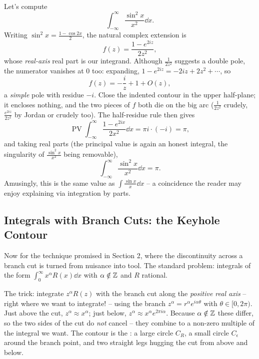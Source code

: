 \documentclass[a4paper]{scrartcl}
\newcommand{\pv}{\operatorname{PV}}
\begin{document}
\begin{example}
	Let's compute
	$$
	\int_{-\infty}^\infty \frac{\sin^2 x}{x^2} \dd x.
	$$
	Writing $\sin^2 x = \frac{1 - \cos 2x}{2}$, the natural complex extension is
	$$
	f(z) = \frac{1 - e^{2iz}}{2z^2},
	$$
	whose \emph{real-axis} real part is our integrand. Although $\frac{1}{2z^2}$ suggests a double pole, the numerator vanishes at $0$ too: expanding, $1 - e^{2iz} = -2iz + 2z^2 + \cdots$, so
	$$
	f(z) = -\frac iz + 1 + O(z),
	$$
	a \emph{simple} pole with residue $-i$. Close the indented contour in the upper half-plane; it encloses nothing, and the two pieces of $f$ both die on the big arc ($\frac{1}{2z^2}$ crudely, $\frac{e^{2iz}}{2z^2}$ by Jordan or crudely too). The half-residue rule then gives
	$$
	\pv \int_{-\infty}^\infty \frac{1 - e^{2ix}}{2x^2} \dd x = \pi i \cdot (-i) = \pi,
	$$
	and taking real parts (the principal value is again an honest integral, the singularity of $\frac{\sin^2 x}{x^2}$ being removable),
	$$
	\int_{-\infty}^\infty \frac{\sin^2 x}{x^2} \dd x = \pi.
	$$
	Amusingly, this is the same value as $\int \frac{\sin x}{x} \dd x$ -- a coincidence the reader may enjoy explaining via integration by parts.
\end{example}

\subsection{Integrals with Branch Cuts: the Keyhole Contour}

Now for the technique promised in Section 2, where the discontinuity across a branch cut is turned from nuisance into tool. The standard problem: integrals of the form $\int_0^\infty x^\alpha R(x) \dd x$ with $\alpha \notin \mathbb{Z}$ and $R$ rational.

The trick: integrate $z^\alpha R(z)$ with the branch cut along the \emph{positive real axis} -- right where we want to integrate! -- using the branch $z^\alpha = r^\alpha e^{i\alpha\theta}$ with $\theta \in [0, 2\pi)$. Just above the cut, $z^\alpha \approx x^\alpha$; just below, $z^\alpha \approx x^\alpha e^{2\pi i \alpha}$. Because $\alpha \notin \mathbb{Z}$ these differ, so the two sides of the cut do \emph{not} cancel -- they combine to a non-zero multiple of the integral we want. The contour is the : a large circle $C_R$, a small circle $C_\epsilon$ around the branch point, and two straight legs hugging the cut from above and below.
\end{document}
